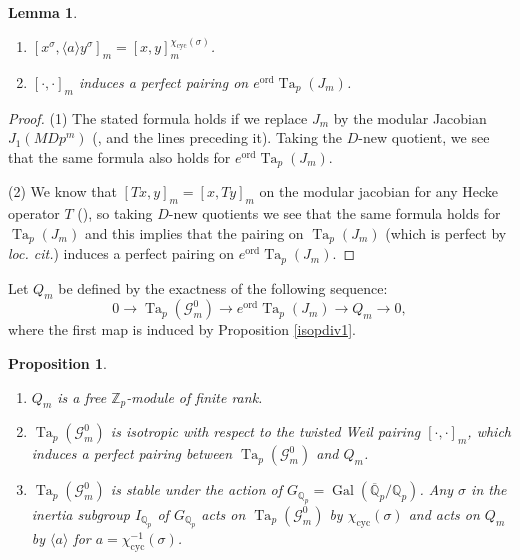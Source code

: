 \documentclass[a4paper,11pt]{amsart}
\numberwithin{equation}{section}
\theoremstyle{plain}
\newtheorem{proposition}[theorem]{Proposition}
\newtheorem{lemma}[theorem]{Lemma}
\theoremstyle{definition}
\theoremstyle{remark}
\newcommand{\Q}{\mathbb{Q}}
\newcommand{\Z}{\mathbb{Z}}
\DeclareMathOperator{\Gal}{Gal}
\DeclareMathOperator{\Ta}{Ta}
\newcommand{\cyc}{{\mathrm{cyc}}}
\newcommand{\ord}{\mathrm{ord}}
\begin{document}
\begin{lemma}\label{lemmapairing}\begin{enumerate}
\item 
$[x^\sigma,\langle a\rangle y^\sigma]_m=[x,y]_m^{\chi_\cyc(\sigma)}$.
\item $[\cdot,\cdot]_m$ induces a perfect pairing on $e^\ord\Ta_p(J_m)$. \end{enumerate}
\end{lemma}
\begin{proof}
    (1) The stated formula holds if we replace $J_m$ by the modular Jacobian $J_1(MDp^m)$ (\cite[(1.2.7)]{OhtaMA}, and the lines preceding it). Taking the $D$-new quotient, we see that the same formula also holds for $e^\ord\Ta_p(J_m)$.
    
    (2) We know that $[Tx,y]_m=[x,Ty]_m$ on the modular jacobian  for any Hecke operator $T$ 
     (\cite[Lemma 4.1]{Til}), so taking $D$-new quotients we see that the same formula holds for $\Ta_p(J_m)$ and this implies that the pairing on $\Ta_p(J_m)$ (which is perfect by \emph{loc. cit.}) induces a perfect pairing on $e^\ord\Ta_p(J_m)$. 
\end{proof}

Let $Q_m$ be defined by the exactness of the following sequence: 
\begin{equation}\label{defQm}
0\longrightarrow \Ta_p(\mathcal{G}_m^0)\longrightarrow e^\ord\Ta_p(J_m)\longrightarrow Q_m\longrightarrow0,\end{equation}
where the first map is induced by Proposition \ref{isopdiv1}.

\begin{proposition}\label{prop1.2.8}
\begin{enumerate}
    \item $Q_m$ is a free $\Z_p$-module of finite rank. 
    \item $\Ta_p(\mathcal{G}_m^0)$ is isotropic with respect to the twisted Weil pairing 
    $[\cdot,\cdot]_m$, which induces a perfect pairing between $\Ta_p(\mathcal{G}_m^0)$ and $Q_m$. 
    \item $\Ta_p(\mathcal{G}_m^0)$ is stable under the action of $G_{\Q_p}=\Gal(\overline{\Q}_p/\Q_p)$. Any $\sigma$ in the inertia subgroup $I_{\Q_p}$ of $G_{\Q_p}$ acts on 
    $\Ta_p(\mathcal{G}_m^0)$ by $\chi_\cyc(\sigma)$ and acts on $Q_m$ by $\langle a\rangle$ for 
    $a=\chi_\cyc^{-1}(\sigma)$.
\end{enumerate}
\end{proposition}
\end{document}
